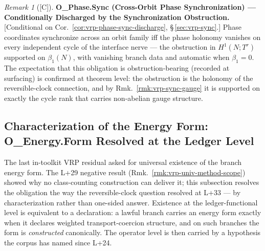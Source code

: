 \documentclass[12pt,oneside]{amsbook}
\theoremstyle{plain}
\theoremstyle{definition}
\theoremstyle{remark}
\newtheorem{remark}[theorem]{Remark}
\newcommand{\status}[1]{\textup{[#1]}}
\begin{document}
\begin{remark}[\status{C}]\label{ob:vrp-phase-sync}
\textbf{O\_Phase.Sync (Cross-Orbit Phase Synchronization) ---
Conditionally Discharged by the Synchronization Obstruction.}
\textup{[Conditional on Cor.~\ref{cor:vrp-phase-sync-discharge},
\S\,\ref{sec:vrp-sync}.]}
Phase coordinates synchronize across an orbit family iff the phase
holonomy vanishes on every independent cycle of the interface
nerve --- the obstruction in $H^1(N; T^r)$ supported on
$\beta_1(N)$, with vanishing branch data and automatic when
$\beta_1 = 0$.  The expectation that this obligation is
obstruction-bearing (recorded at surfacing) is confirmed at
theorem level: the obstruction is the holonomy of the
reversible-clock connection, and by
Rmk.~\ref{rmk:vrp-sync-gauge} it is supported on exactly the
cycle rank that carries non-abelian gauge structure.
\end{remark}

\subsection{Characterization of the Energy Form: O\_Energy.Form
Resolved at the Ledger Level}
\label{sec:vrp-energy-form}

The last in-toolkit VRP residual asked for universal existence of
the branch energy form.  The L+29 negative result
(Rmk.~\ref{rmk:vrp-univ-method-scope}) showed why no
class-counting construction can deliver it; this subsection
resolves the obligation the way the reversible-clock question
resolved at L+33 --- by characterization rather than one-sided
answer.  Existence at the ledger-functional level is equivalent
to a declaration: a lawful branch carries an energy form exactly
when it declares weighted transport-coercion structure, and on
such branches the form is \emph{constructed} canonically.  The
operator level is then carried by a hypothesis the corpus has
named since L+24.
\end{document}
